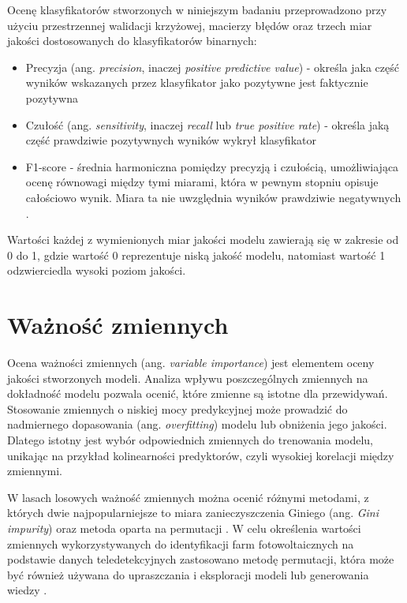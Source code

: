 \documentclass{amuthesis}
\begin{document}
Ocenę klasyfikatorów stworzonych w niniejszym badaniu przeprowadzono
przy użyciu przestrzennej walidacji krzyżowej, macierzy błędów oraz
trzech miar jakości dostosowanych do klasyfikatorów binarnych:

\begin{itemize}
\item
  Precyzja (ang. \emph{precision}, inaczej \emph{positive predictive
  value}) - określa jaka część wyników wskazanych przez klasyfikator
  jako pozytywne jest faktycznie pozytywna
  \autocite{jaworski_2013_perfomance_measures}
\item
  Czułość (ang. \emph{sensitivity}, inaczej \emph{recall} lub \emph{true
  positive rate}) - określa jaką część prawdziwie pozytywnych wyników
  wykrył klasyfikator \autocite{jaworski_2013_perfomance_measures}
\item
  F1-score - średnia harmoniczna pomiędzy precyzją i czułością,
  umożliwiająca ocenę równowagi między tymi miarami, która w pewnym
  stopniu opisuje całościowo wynik. Miara ta nie uwzględnia wyników
  prawdziwie negatywnych \autocite{zygierewicz_2021_ml}.
\end{itemize}

Wartości każdej z wymienionych miar jakości modelu zawierają się w
zakresie od 0 do 1, gdzie wartość 0 reprezentuje niską jakość modelu,
natomiast wartość 1 odzwierciedla wysoki poziom jakości.

\hypertarget{sec-variable-importance}{%
\section{Ważność zmiennych}\label{sec-variable-importance}}

Ocena ważności zmiennych (ang. \emph{variable importance}) jest
elementem oceny jakości stworzonych modeli. Analiza wpływu
poszczególnych zmiennych na dokładność modelu pozwala ocenić, które
zmienne są istotne dla przewidywań. Stosowanie zmiennych o niskiej mocy
predykcyjnej może prowadzić do nadmiernego dopasowania (ang.
\emph{overfitting}) modelu lub obniżenia jego jakości. Dlatego istotny
jest wybór odpowiednich zmiennych do trenowania modelu, unikając na
przykład kolinearności predyktorów, czyli wysokiej korelacji między
zmiennymi.

W lasach losowych ważność zmiennych można ocenić różnymi metodami, z
których dwie najpopularniejsze to miara zanieczyszczenia Giniego (ang.
\emph{Gini impurity}) oraz metoda oparta na permutacji
\autocite{biecek_2017_przewodnik}. W celu określenia wartości zmiennych
wykorzystywanych do identyfikacji farm fotowoltaicznych na podstawie
danych teledetekcyjnych zastosowano metodę permutacji, która może być
również używana do upraszczania i eksploracji modeli lub generowania
wiedzy \autocite{biecek_2021_model_analysis}.
\end{document}
